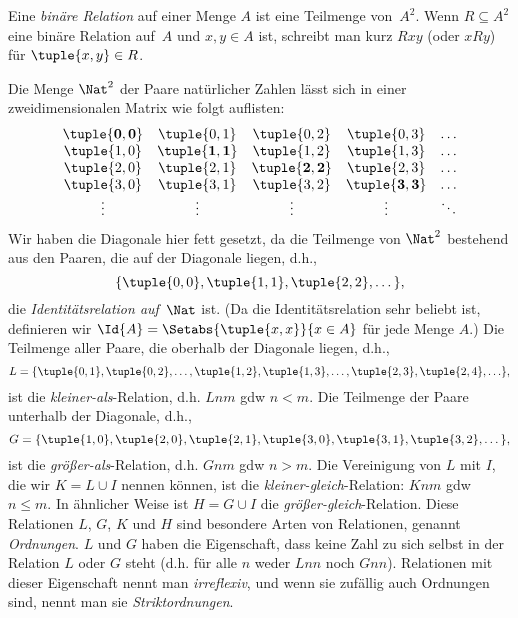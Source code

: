 \documentclass[../../../include/open-logic-section]{subfiles}
\begin{document}
\begin{defn} 
Eine \emph{binäre Relation} auf einer Menge $A$ ist eine Teilmenge von~$A^{2}$. Wenn $R
\subseteq A^{2}$ eine binäre Relation auf~$A$ und $x, y \in A$ ist, schreibt man kurz
$Rxy$ (oder $xRy$) für $\tuple{x, y} \in R$.
\end{defn}
  
\begin{ex}
Die Menge $\Nat^{2}$ der Paare natürlicher Zahlen lässt sich in einer
zweidimensionalen Matrix wie folgt auflisten:
\[
  \begin{array}{ccccc}
  \mathbf{\tuple{ 0,0 }} & \tuple{ 0,1 } &
    \tuple{ 0,2 } & \tuple{ 0,3 } & \ldots\\
  \tuple{ 1,0 } & \mathbf{\tuple{ 1,1 }} &
    \tuple{ 1,2 } & \tuple{ 1,3 } & \ldots\\
  \tuple{ 2,0 } & \tuple{ 2,1 } &
    \mathbf{\tuple{ 2,2 }} & \tuple{ 2,3 } & \ldots\\
  \tuple{ 3,0 } & \tuple{ 3,1 } & \tuple{ 3,2 } &
    \mathbf{\tuple{ 3,3 }} & \ldots\\
  \vdots & \vdots & \vdots & \vdots & \mathbf{\ddots}
  \end{array}
\]
Wir haben die Diagonale hier fett gesetzt, da die Teilmenge von $\Nat^2$
bestehend aus den Paaren, die auf der Diagonale liegen, d.h.,
\[
  \{\tuple{0,0 }, \tuple{ 1,1 }, \tuple{ 2,2 }, \dots\},
  \]
die \emph{Identitätsrelation auf}~$\Nat$ ist. (Da die Identitätsrelation sehr
beliebt ist, definieren wir $\Id{A}=\Setabs{\tuple{ x,x }}{x \in
A}$ für jede Menge $A$.) Die Teilmenge aller Paare, die oberhalb der
Diagonale liegen, d.h.,
\[
  L = \{\tuple{ 0,1 },\tuple{ 0,2 },\ldots,\tuple{ 1,2 },
  \tuple{ 1,3 }, \dots, \tuple{ 2,3 }, \tuple{ 2,4 },\ldots\},
\]
ist die \emph{kleiner-als}-Relation, d.h. $Lnm$ gdw $n<m$. Die Teilmenge der
Paare unterhalb der Diagonale, d.h.,
\[
  G=\{ \tuple{ 1,0 },\tuple{ 2,0 },\tuple{
    2,1 }, \tuple{ 3,0 },\tuple{ 3,1 },\tuple{ 3,2 }, \dots\},
\]
ist die \emph{größer-als}-Relation, d.h. $Gnm$ gdw $n>m$. Die Vereinigung
von $L$ mit $I$, die wir $K=L\cup I$ nennen können, ist die \emph{kleiner-gleich}-Relation:
$Knm$ gdw $n \le m$. In ähnlicher Weise ist $H=G \cup
I$ die \emph{größer-gleich}-Relation. Diese Relationen
$L$, $G$, $K$ und $H$ sind besondere Arten von Relationen, genannt
\emph{Ordnungen}. $L$ und $G$ haben die Eigenschaft, dass keine Zahl zu sich selbst in der Relation
$L$ oder $G$ steht (d.h. für alle $n$ weder $Lnn$ noch $Gnn$).
Relationen mit dieser Eigenschaft nennt man \emph{irreflexiv}, und wenn
sie zufällig auch Ordnungen sind, nennt man sie \emph{Striktordnungen}.
\end{ex}
\end{document}
